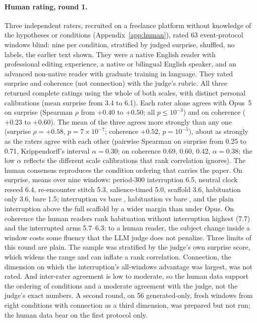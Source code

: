 \paragraph{Human rating, round 1.} Three independent raters, recruited on a
freelance platform without knowledge of the hypotheses or conditions
(Appendix~\ref{app:human}), rated 63 event-protocol windows blind: nine per
condition, stratified by judged surprise, shuffled, no labels, the earlier
text shown. They were a native English reader with professional editing
experience, a native or bilingual English speaker, and an advanced
non-native reader with graduate training in language. They rated surprise
and coherence (not connection) with the judge's rubric. All three returned
complete ratings using the whole of both scales, with distinct personal
calibrations (mean surprise from 3.4 to 6.1). Each rater alone agrees with
Opus~5 on surprise (Spearman $\rho$ from $+0.40$ to $+0.50$; all $p\le
10^{-3}$) and on coherence ($+0.23$ to $+0.60$). The mean of the three
agrees more strongly than any one (surprise $\rho=+0.58$, $p=7\times10^{-7}$;
coherence $+0.52$, $p=10^{-5}$), about as strongly as the raters agree with
each other (pairwise Spearman on surprise from 0.25 to 0.71, Krippendorff's
interval $\alpha=0.30$; on coherence 0.69, 0.60, 0.42, $\alpha=0.38$; the low
$\alpha$ reflects the different scale calibrations that rank correlation
ignores). The human consensus reproduces the condition ordering that carries
the paper. On surprise, means over nine windows: period-300 interruption 6.5,
neutral clock reseed 6.4, re-encounter stitch 5.3, salience-timed 5.0,
scaffold 3.6, habituation only 3.6, bare 1.5; interruption vs bare
, habituation vs bare , and the plain
interruption above the full scaffold by a wider margin than under Opus. On
coherence the human readers rank habituation without interruption highest
(7.7) and the interrupted arms 5.7--6.3: to a human reader, the subject
change inside a window costs some fluency that the LLM judge does not
penalize. Three limits of this round are plain. The sample was stratified by
the judge's own surprise score, which widens the range and can inflate a
rank correlation. Connection, the dimension on which the interruption's
all-windows advantage was largest, was not rated. And inter-rater agreement
is low to moderate, so the human data support the ordering of conditions and
a moderate agreement with the judge, not the judge's exact numbers. A second
round, on 56 generated-only, fresh windows from eight conditions with
connection as a third dimension, was prepared but not run; the human data
bear on the first protocol only.
